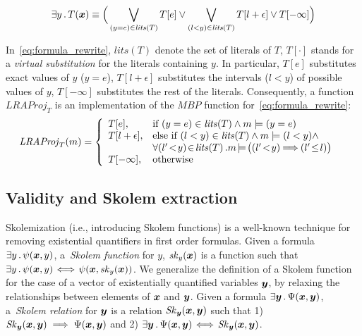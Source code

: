 \begin{equation}
  \exists y \such T (\vx) \equiv \Big( \Lor_{(y = e) \in \mathit{lits}(T)}{T[e]} \lor
  	\Lor_{(l < y) \in \mathit{lits} (T)}{T [l + \epsilon]} \lor
	T[-\infty] \Big)\label{eq:formula_rewrite}
\end{equation} 
\smallskip  

In~\eqref{eq:formula_rewrite}, $\mathit{lits}(T)$ denote the set of literals of $T$, $T[\cdot]$ stands for a \emph{virtual substitution} for the literals containing $y$.
In particular, $T[e]$ substitutes exact values of $y$ ($y=e$), $T[l+\epsilon]$ substitutes the intervals ($l < y$) of possible values of $y$, $T[-\infty]$ substitutes the rest of the literals.
Consequently, a function $\mathit{LRAProj_{T}}$ is an implementation of the $\mathit{MBP}$ function for~\eqref{eq:formula_rewrite}:%
%
\begin{equation}
\begin{aligned}
\label{case:proj_define}
&\mathit{LRAProj}_{T}(m) = \left\{
\begin{array}{ll}
T[e], 			& \mbox{if}\ (y=e) \in \mathit{lits}(T) \land 
			m \models (y = e)\\
T[l+ \epsilon],	& \mbox{else if}\ (l < y) \in \mathit{lits}(T) 
			\land m \models (l < y) \land \\
			& \forall (l'\!<\!y)\!\in\!\mathit{lits}(T) \such \!m\!\models\!\big((l'\!<\!y)\!\!\implies\!\!(l'\! \le\! l)\big)\\
T[-\infty], 		& \mbox{otherwise}	
\end{array}
\right.
\end{aligned}
\end{equation}





\subsection{Validity and Skolem extraction}
\label{sim:check}

\aevalalgorithm  

Skolemization (i.e., introducing Skolem functions) is a well-known
technique for removing existential quantifiers in first order formulas.
%
Given a formula ${ \exists y \such \psi(\vx, y)}$,
a~\emph{Skolem function} for $y$, $\mathit{sk}_{y}(\vx)$ is a function such that
$\exists y \such \psi(\vx,y)\!\iff\!\psi (\vx, \mathit{sk}_{y} (\vx))$.
We generalize the definition of a Skolem function for the case of a
vector of existentially quantified variables $\vy$, by relaxing the
relationships between elements of $\vx$ and $\vy$.
Given a formula ${\exists \vy \such \Psi(\vx, \vy)}$, a~\emph{Skolem relation} for $\vy$ is a relation ${\mathit{Sk}_{\vy} (\vx, \vy)}$ such that 1) $\mathit{Sk}_{\vy} (\vx, \vy) \implies \Psi (\vx, \vy)$ and 2) $\exists \vy \such \Psi(\vx, \vy)\!\iff\!\mathit{Sk}_{\vy} (\vx, \vy)$.
  

